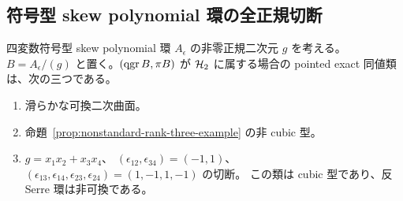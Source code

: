\subsection{符号型 skew polynomial 環の全正規切断}
\label{subsec:sign-normal-quadrics}

\begin{theorem}
\label{thm:sign-quadric-normal}
四変数符号型 skew polynomial 環 $A_\epsilon$ の非零正規二次元 $g$ を考える。
$B=A_\epsilon/(g)$ と置く。$(\operatorname{qgr} B,\pi B)$ が $\mathcal H_2$ に属する場合の
pointed exact 同値類は、次の三つである。
\begin{enumerate}
\item 滑らかな可換二次曲面。
\item 命題~\ref{prop:nonstandard-rank-three-example} の非 cubic 型。
\item $g=x_1x_2+x_3x_4$、
$(\epsilon_{12},\epsilon_{34})=(-1,1)$、
$(\epsilon_{13},\epsilon_{14},\epsilon_{23},\epsilon_{24})=(1,-1,1,-1)$ の切断。
この類は cubic 型であり、反 Serre 環は非可換である。
\end{enumerate}
\end{theorem}

